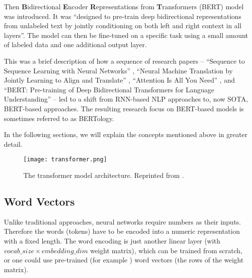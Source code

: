 Then \textbf{B}idirectional \textbf{E}ncoder \textbf{R}epresentations from \textbf{T}ransformers (BERT) \citep{bert} model was introduced. It was ``designed to pre-train deep bidirectional representations from unlabeled text by jointly conditioning on both left and right context in all layers''. 
The model can then be fine-tuned on a specific task using a small amount of labeled data and one additional output layer. 

This was a brief description of how a sequence of research papers -- ``Sequence to Sequence Learning with Neural Networks'' \citep{seq2seq}, ``Neural Machine Translation by Jointly Learning to Align and Translate'' \citep{first-attention}, ``Attention Is All You Need'' \citep{attention-is-all-you-need}, and ``BERT: Pre-training of Deep Bidirectional Transformers for Language Understanding'' \citep{bert} -- led to a shift from RNN-based NLP approaches to, now SOTA, BERT-based approaches.
The resulting research focus on BERT-based models is sometimes referred to as BERTology.

In the following sections, we will explain the concepts mentioned above in greater detail.


\begin{figure}[!htb]
        \centering
        \texttt{[image: transformer.png]}
        \caption[Transformer Model Architecture]{The transformer model architecture. Reprinted from \citep{attention-is-all-you-need}.}
        \label{fig:transformer}
\end{figure}

\subsection{Word Vectors}
\label{subsec:wordemb}

Unlike traditional approaches, neural networks require numbers as their inputs.
Therefore the words (tokens) have to be encoded into a numeric representation with a fixed length.
The word encoding is just another linear layer (with $vocab\_size \times embedding\_dim$ weight matrix), which can be trained from scratch, or one could use pre-trained (for example \citep{glove}) word vectors (the rows of the weight matrix).

